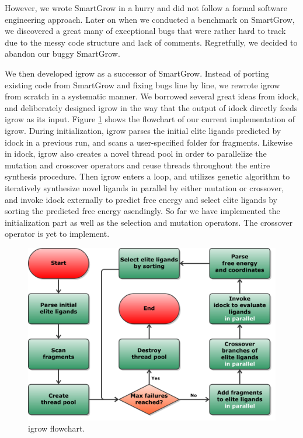 However, we wrote SmartGrow in a hurry and did not follow a formal software engineering approach. Later on when we conducted a benchmark on SmartGrow, we discovered a great many of exceptional bugs that were rather hard to track due to the messy code structure and lack of comments. Regretfully, we decided to abandon our buggy SmartGrow.

We then developed igrow as a successor of SmartGrow. Instead of porting existing code from SmartGrow and fixing bugs line by line, we rewrote igrow from scratch in a systematic manner. We borrowed several great ideas from idock, and deliberately designed igrow in the way that the output of idock directly feeds igrow as its input. Figure \ref{igrow:Flowchart} shows the flowchart of our current implementation of igrow. During initialization, igrow parses the initial elite ligands predicted by idock in a previous run, and scans a user-specified folder for fragments. Likewise in idock, igrow also creates a novel thread pool in order to parallelize the mutation and crossover operators and reuse threads throughout the entire synthesis procedure. Then igrow enters a loop, and utilizes genetic algorithm to iteratively synthesize novel ligands in parallel by either mutation or crossover, and invoke idock externally to predict free energy and select elite ligands by sorting the predicted free energy asendingly. So far we have implemented the initialization part as well as the selection and mutation operators. The crossover operator is yet to implement.

\begin{figure}
\centering
\includegraphics[width=\textwidth]{igrow/Flowchart.pdf}
\caption{igrow flowchart.}
\label{igrow:Flowchart}
\end{figure}

